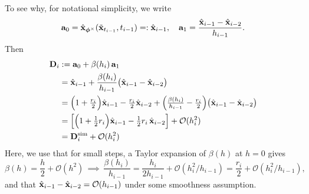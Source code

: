 To see why, for notational simplicity, we write
\[
{\mathbf{a}}_0=\hat{{\mathbf{x}}}_{\bm{\phi}^\times}(\tilde{{\mathbf{x}}}_{t_{i-1}},t_{i-1})=:\hat{{\mathbf{x}}}_{i-1},\quad
{\mathbf{a}}_1=\frac{\hat{{\mathbf{x}}}_{i-1}-\hat{{\mathbf{x}}}_{i-2}}{h_{i-1}}.
\]
Then
\begin{align*}
{\mathbf{D}}_i
&:= {\mathbf{a}}_0+\beta(h_i)\,{\mathbf{a}}_1 
\\
&= \hat{{\mathbf{x}}}_{i-1} + \frac{\beta(h_i)}{h_{i-1}}\big(\hat{{\mathbf{x}}}_{i-1}-\hat{{\mathbf{x}}}_{i-2}\big)
\\
&= \Big(1+\tfrac{r_i}{2}\Big)\hat{{\mathbf{x}}}_{i-1} - \tfrac{r_i}{2}\hat{{\mathbf{x}}}_{i-2}
   + \Big(\tfrac{\beta(h_i)}{h_{i-1}}-\tfrac{r_i}{2}\Big)\big(\hat{{\mathbf{x}}}_{i-1}-\hat{{\mathbf{x}}}_{i-2}\big)
\\
&= \left[\Big(1+\tfrac12 r_i\Big)\hat{{\mathbf{x}}}_{i-1}-\tfrac12 r_i\,\hat{{\mathbf{x}}}_{i-2}\right]
   + \mathcal O(h_i^2)
   \\&={\mathbf{D}}_i^{\mathrm{sim}}
   + \mathcal O(h_i^2)
\end{align*}
Here, we use that for small steps, a Taylor expansion of $\beta(h)$ at $h=0$ gives
\[
\beta(h)=\frac{h}{2}+\mathcal{O}(h^{2})
\,\implies\,
\frac{\beta(h_i)}{h_{i-1}}
=\frac{h_i}{2h_{i-1}}+\mathcal{O}(h_i^{2}/h_{i-1})
=\frac{r_i}{2}+\mathcal{O}(h_i^{2}/h_{i-1}),
\]
and that $\hat{{\mathbf{x}}}_{i-1}- \hat{{\mathbf{x}}}_{i-2} = \mathcal{O}(h_{i-1})$ under some smoothness assumption.



